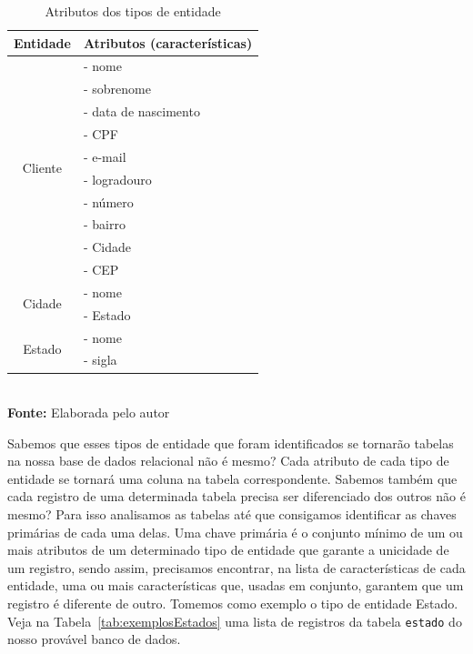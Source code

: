 \FloatBarrier
\begin{table}[ht]
    \centering
    \caption{Atributos dos tipos de entidade}
	\begin{tabular}{cl}
	    \hline
	        \textbf{Entidade}     & \textbf{Atributos (características)} \\ \hline
	    \multirow{10}{*}{Cliente} & - nome                                 \\
	                              & - sobrenome                            \\
	                              & - data de nascimento                   \\
	                              & - CPF                                  \\
	                              & - e-mail                               \\
	                              & - logradouro                           \\ 
	                              & - número                               \\
	                              & - bairro                               \\
	                              & - Cidade                               \\
	                              & - CEP                                  \\ \hline
	     \multirow{2}{*}{Cidade}  & - nome                                 \\
	                              & - Estado                               \\ \hline
	     \multirow{2}{*}{Estado}  & - nome                                 \\
	                              & - sigla                                \\ \hline
	\end{tabular}
    \\ \vspace{0.2cm}
    \textbf{Fonte:} Elaborada pelo autor
    \label{tab:caracteristicasEntidades}
\end{table}
\FloatBarrier

Sabemos que esses tipos de entidade que foram identificados se tornarão tabelas na nossa base de dados relacional não é mesmo? Cada atributo de cada tipo de entidade se tornará uma coluna na tabela correspondente. Sabemos também que cada registro de uma determinada tabela precisa ser diferenciado dos outros não é mesmo? Para isso analisamos as tabelas até que consigamos identificar as chaves primárias de cada uma delas. Uma chave primária é o conjunto mínimo de um ou mais atributos de um determinado tipo de entidade que garante a unicidade de um registro, sendo assim, precisamos encontrar, na lista de características de cada entidade, uma ou mais características que, usadas em conjunto, garantem que um registro é diferente de outro. Tomemos como exemplo o tipo de entidade Estado. Veja na Tabela~\ref{tab:exemplosEstados} uma lista de registros da tabela \texttt{estado} do nosso provável banco de dados.

